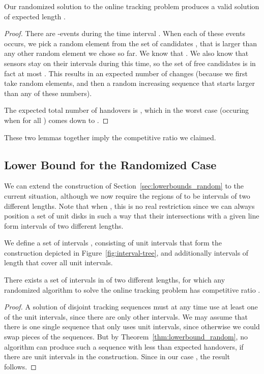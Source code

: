 \documentclass[runningheads]{llncs}
\newcommand{\marrow}{\marginpar[\hfill]{}}
\renewcommand{\remark}[3]{\textcolor{blue}{\textsc{#1 #2:}}
\textcolor{red}{\marrow\textsf{#3}}}
\renewcommand{\remark}[3]{\relax}
\newcommand{\maarten}[2][says]{\remark{Maarten}{#1}{#2}}
\begin{document}
    \begin {lemma}
      Our randomized solution to the online tracking problem produces a valid solution of expected length .
    \end {lemma}

    \begin {proof}
      There are  -events during the time interval . When each of these events occurs, we pick a random element from the set of candidates , that is larger than any other random element we chose so far. We know that . We also know that  sensors stay on their intervals during this time, so the set of free candidates is in fact at most .
      This results in an expected number of  changes (because we first take  random elements, and then a random increasing sequence that starts larger than any of these numbers). 

      The expected total number of handovers is , which in the worst case (occuring when  for all ) comes down to .
    \end {proof}      

    These two lemmas together imply the competitive ratio we claimed.

    \maarten {The other algorithms are easier anyway, so they probably also generalize.}

  \subsection {Lower Bound for the Randomized Case}
    We can extend the construction of Section~\ref {sec:lowerbounds_random} to the current situation, although we now require the regions of  to be intervals of two different lengths. Note that when , this is no real restriction since we can always position a set of unit disks in such a way that their intersections with a given line form intervals of two different lengths.
    
    We define a set of intervals , consisting of  unit intervals that form the construction depicted in Figure~\ref {fig:interval-tree}, and additionally  intervals of length  that cover all  unit intervals.
    
\begin {theorem} \label {thm:trilateration-lowerbound}
  There exists a set  of intervals in  of two different lengths, for which any randomized algorithm to solve the online tracking problem has competitive ratio .
\end {theorem}

    \begin {proof}
      A solution of  disjoint tracking sequences must at any time use at least one of the  unit intervals, since there are only  other intervals.
      We may assume that there is one single sequence that only uses unit intervals, since otherwise we could swap pieces of the sequences. But by Theorem~\ref {thm:lowerbound_random}, no algorithm can produce such a sequence with less than  expected handovers, if there are  unit intervals in the construction. Since in our case , the result follows.
    \end {proof}
\end{document}
